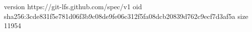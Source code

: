 version https://git-lfs.github.com/spec/v1
oid sha256:3cde831f5e781d06f3b9c08de9fe06c312f5fa08dcb20839d762c9ecf7d3af5a
size 11954
